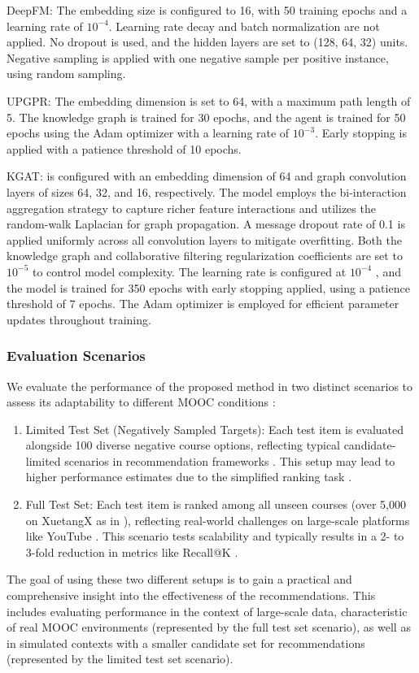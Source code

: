 \documentclass{ieeeaccess}
\begin{document}
    DeepFM: The embedding size is configured to 16, with 50 training epochs and a learning rate of \(10^{-4}\). Learning rate decay and batch normalization are not applied. No dropout is used, and the hidden layers are set to (128, 64, 32) units. Negative sampling is applied with one negative sample per positive instance, using random sampling.
        
    UPGPR: The embedding dimension is set to 64, with a maximum path length of 5. The knowledge graph is trained for 30 epochs, and the agent is trained for 50 epochs using the Adam optimizer with a learning rate of \(10^{-3}\). Early stopping is applied with a patience threshold of 10 epochs.
        
    KGAT: is configured with an embedding dimension of 64 and graph convolution layers of sizes 64, 32, and 16, respectively. The model employs the bi-interaction aggregation strategy to capture richer feature interactions and utilizes the random-walk Laplacian for graph propagation. A message dropout rate of 0.1 is applied uniformly across all convolution layers to mitigate overfitting. Both the knowledge graph and collaborative filtering regularization coefficients are set to \(10^{-5}\)  to control model complexity. The learning rate is configured at \(10^{-4}\) , and the model is trained for 350 epochs with early stopping applied, using a patience threshold of 7 epochs. The Adam optimizer is employed for efficient parameter updates throughout training.


\subsubsection{Evaluation Scenarios}

We evaluate the performance of the proposed method in two distinct scenarios to assess its adaptability to different MOOC conditions \cite{rendle2012bprmf, he2017neural}:
\begin{enumerate}
    \item Limited Test Set (Negatively Sampled Targets): Each test item is evaluated alongside 100 diverse negative course options, reflecting typical candidate-limited scenarios in recommendation frameworks \cite{koren2008factorization, cremonesi2010performance}. This setup may lead to higher performance estimates due to the simplified ranking task \cite{jannach2020recommender}.
    \item Full Test Set: Each test item is ranked among all unseen courses (over 5,000 on XuetangX as in \cite{kizilcec2015attrition_missing_MOOC}), reflecting real-world challenges on large-scale platforms like YouTube \cite{covington2016youtube}. This scenario tests scalability and typically results in a 2- to 3-fold reduction in metrics like Recall@K \cite{jannach2020recommender}.
\end{enumerate}
The goal of using these two different setups is to gain a practical and comprehensive insight into the effectiveness of the recommendations. This includes evaluating performance in the context of large-scale data, characteristic of real MOOC environments (represented by the full test set scenario), as well as in simulated contexts with a smaller candidate set for recommendations (represented by the limited test set scenario).
\end{document}
